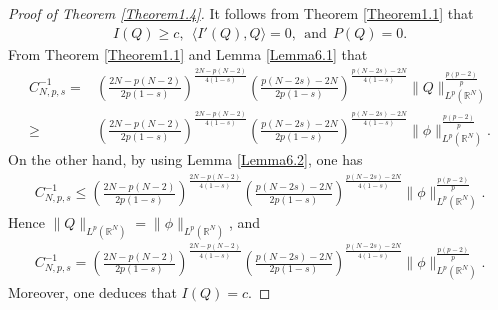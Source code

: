 \documentclass[12pt,a4paper,reqno]{amsart}
\numberwithin{equation}{section}
\begin{document}
\begin{proof}[Proof of Theorem \ref{Theorem1.4}]
It follows from Theorem \ref{Theorem1.1} that
\begin{equation*}
\begin{aligned}
I(Q)\geqslant c,
~~\langle I'(Q),Q\rangle=0, ~~\mathrm{and}~~P(Q)=0.
\end{aligned}
\end{equation*}
From  Theorem \ref{Theorem1.1} and Lemma \ref{Lemma6.1} that
\begin{equation*}
\begin{aligned}
C_{N,p,s}^{-1}
=&
\left(
\frac{2N-p(N-2)}{2p(1-s)}
\right)
^{\frac{2N-p(N-2)}{4(1-s)}}
\left(
\frac{p(N-2s)-2N}{2p(1-s)}
\right)
^{\frac{p(N-2s)-2N}{4(1-s)}}
\|Q\|_{L^{p}(\mathbb{R}^{N})}^{\frac{p(p-2)}{p}}\\
\geqslant&
\left(
\frac{2N-p(N-2)}{2p(1-s)}
\right)
^{\frac{2N-p(N-2)}{4(1-s)}}
\left(
\frac{p(N-2s)-2N}{2p(1-s)}
\right)
^{\frac{p(N-2s)-2N}{4(1-s)}}
\|\phi\|_{L^{p}(\mathbb{R}^{N})}^{\frac{p(p-2)}{p}}.
\end{aligned}
\end{equation*}
On the other hand, by using Lemma \ref{Lemma6.2}, one has
\begin{equation*}
\begin{aligned}
C_{N,p,s}^{-1}
\leqslant
\left(
\frac{2N-p(N-2)}{2p(1-s)}
\right)
^{\frac{2N-p(N-2)}{4(1-s)}}
\left(
\frac{p(N-2s)-2N}{2p(1-s)}
\right)
^{\frac{p(N-2s)-2N}{4(1-s)}}
\|\phi\|_{L^{p}(\mathbb{R}^{N})}^{\frac{p(p-2)}{p}}.
\end{aligned}
\end{equation*}
Hence $\|Q\|_{L^{p}(\mathbb{R}^{N})}=\|\phi\|_{L^{p}(\mathbb{R}^{N})}$, and
\begin{equation*}
\begin{aligned}
C_{N,p,s}^{-1}
=
\left(
\frac{2N-p(N-2)}{2p(1-s)}
\right)
^{\frac{2N-p(N-2)}{4(1-s)}}
\left(
\frac{p(N-2s)-2N}{2p(1-s)}
\right)
^{\frac{p(N-2s)-2N}{4(1-s)}}
\|\phi\|_{L^{p}(\mathbb{R}^{N})}^{\frac{p(p-2)}{p}}.
\end{aligned}
\end{equation*}
Moreover, one deduces that $I(Q)=c$.


\end{proof}
\end{document}
